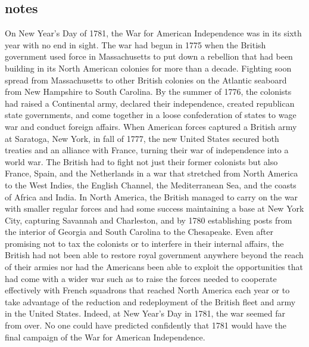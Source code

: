 \subsection{notes}

On New Year's Day of 1781, the War for American Independence was in its sixth
year with no end in sight. The war had begun in 1775 when the British
government used force in Massachusetts to put down a rebellion that had been
building in its North American colonies for more than a decade. Fighting soon
spread from Massachusetts to other British colonies on the Atlantic seaboard
from New Hampshire to South Carolina. By the summer of 1776, the colonists had
raised a Continental army, declared their independence, created republican
state governments, and come together in a loose confederation of states to wage
war and conduct foreign affairs. When American forces captured a British army
at Saratoga, New York, in fall of 1777, the new United States secured both
treaties and an alliance with France, turning their war of independence into a
world war. The British had to fight not just their former colonists but also
France, Spain, and the Netherlands in a war that stretched from North America
to the West Indies, the English Channel, the Mediterranean Sea, and the coasts
of Africa and India. In North America, the British managed to carry on the war
with smaller regular forces and had some success maintaining a base at New York
City, capturing Savannah and Charleston, and by 1780 establishing posts from
the interior of Georgia and South Carolina to the Chesapeake. Even after
promising not to tax the colonists or to interfere in their internal affairs,
the British had not been able to restore royal government anywhere beyond the
reach of their armies nor had the Americans been able to exploit the
opportunities that had come with a wider war such as to raise the forces needed
to cooperate effectively with French squadrons that reached North America each
year or to take advantage of the reduction and redeployment of the British
fleet and army in the United States. Indeed, at New Year's Day in 1781, the war
seemed far from over. No one could have predicted confidently that 1781 would
have the final campaign of the War for American Independence.

